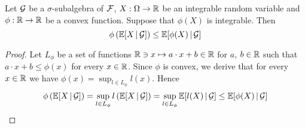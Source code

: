 \begin{theorem}
Let ${\mathcal G}$ be a $\sigma$-subalgebra of ${\mathcal F}$, $X:\Omega \rightarrow {\mathbb R}$ be an integrable random variable and $\phi:{\mathbb R}\rightarrow {\mathbb R}$ be a convex function. Suppose that $\phi(X)$ is integrable. Then
$$\phi\left(\mathbb{E}[X\,|\,{\mathcal G}]\right)\leq \mathbb{E}[\phi(X)\,|\,{\mathcal G}]$$
\end{theorem}
\begin{proof}
Let $L_{\phi}$ be a set of functions ${\mathbb R}\ni x\mapsto a\cdot x+b\in {\mathbb R}$ for $a$, $b\in {\mathbb R}$ such that $a\cdot x+b\leq \phi(x)$ for every $x\in {\mathbb R}$. Since $\phi$ is convex, we derive that for every $x\in {\mathbb R}$ we have $\phi(x) = \sup_{l\in L_{\phi}}l(x)$. Hence
$$\phi\left(\mathbb{E}[X\,|\,{\mathcal G}]\right)=\sup_{l\in L_{\phi}} l\left(\mathbb{E}[X\,|\,{\mathcal G}]\right) = \sup_{l\in L_{\phi}}\mathbb{E}[l(X)\,|\,{\mathcal G}]\leq \mathbb{E}[\phi(X)\,|\,{\mathcal G}]$$
\end{proof}




































































\small



